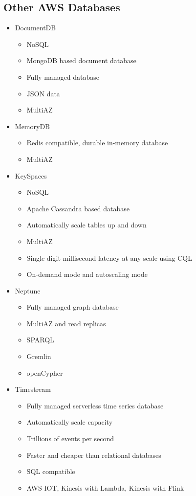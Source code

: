 \documentclass[../../main.tex]{subfiles}
\begin{document}
\subsection{Other AWS Databases}
\begin{itemize}
    \item DocumentDB
    \begin{itemize}
        \item NoSQL
        \item MongoDB based document database
        \item Fully managed database
        \item JSON data
        \item MultiAZ
    \end{itemize}
    \item MemoryDB
    \begin{itemize}
        \item Redis compatible, durable in-memory database
        \item MultiAZ
    \end{itemize}
    \item KeySpaces
    \begin{itemize}
        \item NoSQL
        \item Apache Cassandra based database
        \item Automatically scale tables up and down
        \item MultiAZ
        \item Single digit millisecond latency at any scale using CQL
        \item On-demand mode and autoscaling mode
    \end{itemize}
    \item Neptune
    \begin{itemize}
        \item Fully managed graph database
        \item MultiAZ and read replicas
        \item SPARQL
        \item Gremlin
        \item openCypher
    \end{itemize}
    \item Timestream
    \begin{itemize}
        \item Fully managed serverless time series database
        \item Automatically scale capacity
        \item Trillions of events per second
        \item Faster and cheaper than relational databases
        \item SQL compatible
        \item AWS IOT, Kinesis with Lambda, Kinesis with Flink
    \end{itemize}
\end{itemize}
\end{document}
